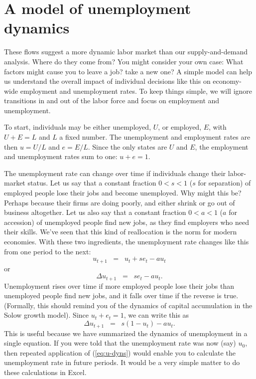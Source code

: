 \section{A model of unemployment dynamics}

These flows suggest a more dynamic labor market than our supply-and-demand
analysis.
Where do they come from?
You might consider your own case:
What factors might cause you to leave a job?  take a new one?
A simple model can help us understand the overall
impact of individual decisions like this on economy-wide
employment and unemployment rates.
To keep things simple, we will ignore transitions in and out of the labor
force and focus on employment and unemployment.

To start, individuals may be either unemployed, $U$, or employed, $E$, with $U+E={L}$ and $L$ a fixed number.
The unemployment and employment rates are then $u=U/{L}$ and $e=E/{L}$.
Since the only states are $U$ and $E$,
the employment and unemployment rates sum to one: $ u+e=1$.

The unemployment rate can change over time if individuals
change their labor-market status.
Let us say that a constant fraction $0<s<1$ ($s$ for separation)
of employed people lose
their jobs and become unemployed.
Why might this be?  Perhaps because their firms are doing poorly,
and either shrink or go out of business altogether.
Let us also say that a constant fraction $0<a<1$ ($a$ for accession) of
unemployed people find new jobs, as they find employers who need their skills.
We've seen that this kind of reallocation is the norm for modern economies.
With these two ingredients, the unemployment rate changes like this
from one period to the next:
\begin{equation*}
    u_{t+1} \;\;=\;\; u_{t}+se_t-au_t
\end{equation*}
or
\[
    \Delta u_{t+1} \;\;=\;\; se_t-au_t .
\]
Unemployment rises over time if more employed people lose their jobs than unemployed people find new jobs, and it falls over time if the reverse is true. (Formally, this should remind you of the dynamics of capital accumulation in the Solow growth model).
Since $u_t+e_t=1$, we can write this as
\begin{equation}
    \Delta u_{t+1} \;\;=\;\; s (1-u_{t})-a u_{t}.
    \label{eq:u-dyns}
\end{equation}
This is useful because we have summarized the dynamics of unemployment in a single equation. If you were told that the unemployment rate was now (say)  $u_{0}$, then repeated application of (\ref{eq:u-dyns}) would enable you to calculate the unemployment rate in future periods. It would be a very simple matter to do these calculations in Excel.

